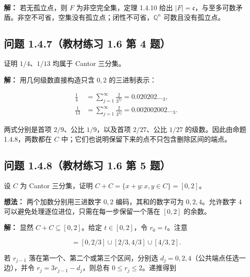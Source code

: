 \documentclass[11pt,a4paper]{article}
\begin{document}
\textbf{解：} 若无孤立点，则 \(F\) 为非空完全集，定理 1.4.10 给出
\(|F|=\mathfrak c\)，与至多可数矛盾。非空不可省，空集没有孤立点；闭性不可省，\(\mathbb Q^n\)
可数且没有孤立点。

\subsection{问题 1.4.7（教材练习 1.6 第 4
题）}\label{ux95eeux9898-1.4.7ux6559ux6750ux7ec3ux4e60-1.6-ux7b2c-4-ux9898}

证明 \(1/4\)、\(1/13\) 均属于 Cantor 三分集。

\textbf{解：} 用几何级数直接构造只含 \(0,2\) 的三进制表示：

\begin{equation*}
\begin{aligned}
\frac14&=\sum_{j=1}^{\infty}\frac2{3^{2j}} =0.020202\ldots_3,\\
\frac1{13}&=\sum_{j=1}^{\infty}\frac2{3^{3j}} =0.002002002\ldots_3.
\end{aligned}\tag{1.4.20}
\end{equation*}

两式分别是首项 \(2/9\)、公比 \(1/9\)，以及首项 \(2/27\)、公比 \(1/27\)
的级数。因此由命题 1.4.8，两数都在 \(C\)
中；它们也说明保留下来的点不只包含删除区间的端点。

\subsection{问题 1.4.8（教材练习 1.6 第 5
题）}\label{ux95eeux9898-1.4.8ux6559ux6750ux7ec3ux4e60-1.6-ux7b2c-5-ux9898}

设 \(C\) 为 Cantor 三分集，证明 \(C+C=\{x+y:x,y\in C\}=[0,2]\)。

\textbf{想法：} 两个加数分别用三进数字 \(0,2\) 编码，其和的数字可为
\(0,2,4\)。允许数字 \(4\) 可以避免处理逐位进位，只需在每一步保留一个落在
\([0,2]\) 的余数。

\textbf{解：} 显然 \(C+C\subseteq[0,2]\)。给定 \(t\in[0,2]\)，令
\(r_0=t\)。注意

\begin{equation*}
[0,2]=[0,2/3]\cup[2/3,4/3]\cup[4/3,2].
\tag{1.4.21}
\end{equation*}

若 \(r_{j-1}\) 落在第一个、第二个或第三个区间，分别选
\(d_j=0,2,4\)（公共端点任选一边），并令 \(r_j=3r_{j-1}-d_j\)，则总有
\(0\leq r_j\leq2\)。递推得到
\end{document}
